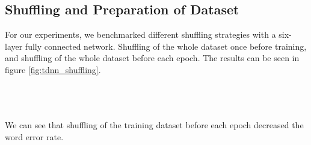 \subsection{Shuffling and Preparation of Dataset}
For our experiments, we benchmarked different shuffling strategies with a six-layer fully connected network. Shuffling of the whole dataset once before training, and shuffling of the whole dataset before each epoch. The results can be seen in figure \ref{fig:tdnn_shuffling}. \\ \\
\begin{minipage}{\linewidth}
	\centering
	\label{fig:tdnn_shuffling}
\end{minipage} \\ \\
We can see that shuffling of the training dataset before each epoch decreased the word error rate. \\
